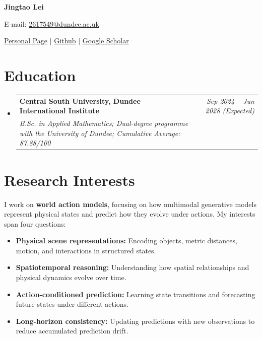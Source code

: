 \documentclass[a4paper,11pt]{article}
\makeatletter
\newcommand{\resumeSubheading}[4]{
\vspace{0.5mm}\item
    \begin{tabular*}{0.98\textwidth}[t]{l@{\extracolsep{\fill}}r}
        \textbf{#1} & \textit{\footnotesize{#4}} \\
        \textit{\footnotesize{#3}} &  \footnotesize{#2}\\
    \end{tabular*}
    \vspace{-2.4mm}
}
\newcommand{\resumeSubHeadingListStart}{\begin{itemize}[leftmargin=*,labelsep=1mm]}
\newcommand{\resumeSubHeadingListEnd}{\end{itemize}\vspace{2mm}}
\newcommand{\socialicon}[1]{\raisebox{-0.05em}{\resizebox{!}{1em}{#1}}}
\newcommand{\headerfontiii}{\fontfamily{ppl}\selectfont} %
\makeatother
\begin{document}
\headerfontiii

\begin{center}
    {\Huge\textbf{Jingtao Lei}}
\end{center}
\vspace{-4mm}

\begin{center}
    \small{
    E-mail: \href{mailto:2617549@dundee.ac.uk}{2617549@dundee.ac.uk}
    }
\end{center}
\begin{center}
\vspace{0.7mm}
    \small{
    \socialicon{\faHome} \href{https://jingtaolei.github.io/}{Personal Page} |
    \socialicon{\faGithub} \href{https://github.com/jingtaolei}{Github} |
    \socialicon{\faGoogle}
    \href{https://scholar.google.com/citations?user=9b8WczoAAAAJ\&hl=en}{Google Scholar}
    }
\end{center}

\vspace{-7mm}

\section{\textbf{Education}}
\vspace{0.6mm}
\resumeSubHeadingListStart
\resumeSubheading
{Central South University, Dundee International Institute}{}
{B.Sc. in Applied Mathematics; Dual-degree programme with the University of Dundee; Cumulative Average: 87.88/100}{{\fontsize{7pt}{8pt}\selectfont Sep 2024 -- Jun 2028 (Expected)}}
\resumeSubHeadingListEnd
\vspace{-5.5mm}

\section{\textbf{Research Interests}}
\vspace{1mm}
\small{
I work on \textbf{world action models}, focusing on how multimodal generative models represent physical states and predict how they evolve under actions. My interests span four questions:
\begin{itemize}
\item \textbf{Physical scene representations:} Encoding objects, metric distances, motion, and interactions in structured states.
\item \textbf{Spatiotemporal reasoning:} Understanding how spatial relationships and physical dynamics evolve over time.
\item \textbf{Action-conditioned prediction:} Learning state transitions and forecasting future states under different actions.
\item \textbf{Long-horizon consistency:} Updating predictions with new observations to reduce accumulated prediction drift.
\end{itemize}
}
\vspace{-4mm}
\end{document}
